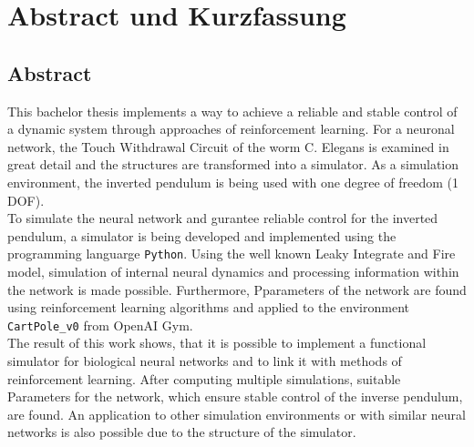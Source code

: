 %
\chapter*{Abstract und Kurzfassung}
%

%
\section*{Abstract}
%
This bachelor thesis implements a way to achieve a reliable and stable control of a dynamic system through approaches of reinforcement learning. For a neuronal network, the \glqq Touch Withdrawal Circuit\grqq{} of the worm C. Elegans is examined in great detail and the structures are transformed into a simulator. As a simulation environment, the inverted pendulum is being used with one degree of freedom (1 DOF).\\
To simulate the neural network and gurantee reliable control for the inverted pendulum, a simulator is being developed and implemented using the programming languarge \texttt{Python}. Using the well known Leaky Integrate and Fire model, simulation of internal neural dynamics and processing information within the network is made possible. Furthermore, Pparameters of the network are found using reinforcement learning algorithms and applied to the environment \texttt{CartPole\_v0} from OpenAI Gym.\\
The result of this work shows, that it is possible to implement a functional simulator for biological neural networks and to link it with methods of reinforcement learning. After computing multiple simulations, suitable Parameters for the network, which ensure stable control of the inverse pendulum, are found. An application to other simulation environments or with similar neural networks is also possible due to the structure of the simulator.


%
